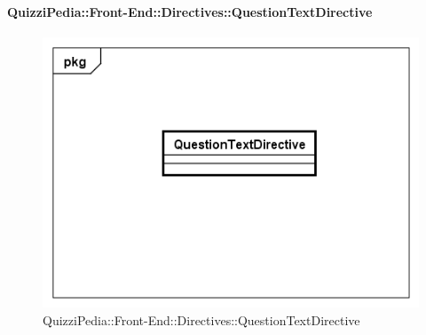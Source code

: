 \paragraph{QuizziPedia::Front-End::Directives::QuestionTextDirective}

\label{QuizziPedia::Front-End::Directives::QuestionTextDirective}

\begin{figure}[h]
	\centering
	\includegraphics[scale=0.5,keepaspectratio]{UML/Classi/Front-End/QuizziPedia_Front-end_Directives_QuestionTextDirective.png}
	\caption{QuizziPedia::Front-End::Directives::QuestionTextDirective}
\end{figure}

